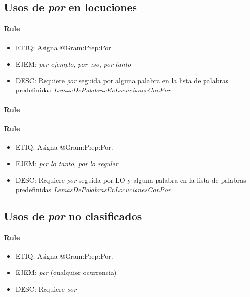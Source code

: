 \documentclass[11pt]{report}
\begin{document}
\subsection{Usos de \emph{por} en locuciones}
\paragraph*{Rule}
\begin{itemize}
\item ETIQ: Asigna @Gram:Prep:Por
\item EJEM: \emph{por ejemplo}, \emph{por eso}, \emph{por tanto}
\item DESC: Requiere \emph{por} seguida por alguna palabra en la lista de palabras predefinidas \emph{LemasDePalabrasEnLocucionesConPor}
\end{itemize}

\paragraph*{Rule}
\paragraph*{Rule}
\begin{itemize}
\item ETIQ: Asigna @Gram:Prep:Por.
\item EJEM: \emph{por lo tanto}, \emph{por lo regular}
\item DESC: Requiere \emph{por} seguida por LO y alguna palabra en la lista de palabras predefinidas \emph{LemasDePalabrasEnLocucionesConPor}
\end{itemize}

\subsection{Usos de \emph{por} no clasificados}
\paragraph*{Rule}
\begin{itemize}
\item ETIQ: Asigna @Gram:Prep:Por.
\item EJEM: \emph{por} (cualquier ocurrencia)
\item DESC: Requiere \emph{por}
\end{itemize}
\end{document}
